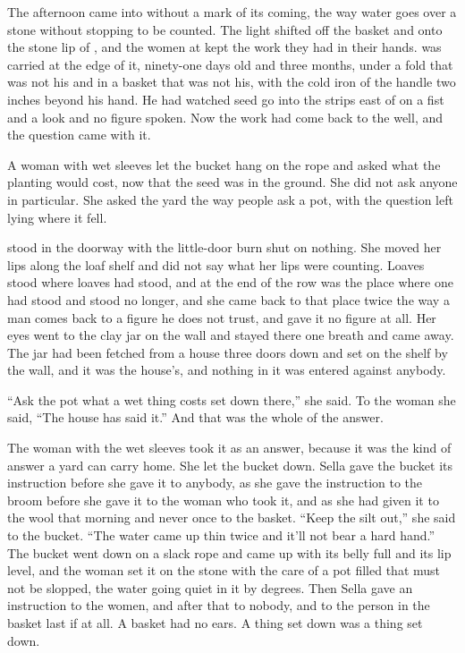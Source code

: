 The afternoon came into  without a mark of its coming, the way water goes over a stone without stopping to be counted. The light shifted off the basket and onto the stone lip of , and the women at  kept the work they had in their hands.  was carried at the edge of it, ninety-one days old and three months, under a fold that was not his and in a basket that was not his, with the cold iron of the handle two inches beyond his hand. He had watched seed go into the strips east of  on a fist and a look and no figure spoken. Now the work had come back to the well, and the question came with it.

A woman with wet sleeves let the bucket hang on the rope and asked what the planting would cost, now that the seed was in the ground. She did not ask anyone in particular. She asked the yard the way people ask a pot, with the question left lying where it fell.

 stood in the  doorway with the little-door burn shut on nothing. She moved her lips along the loaf shelf and did not say what her lips were counting. Loaves stood where loaves had stood, and at the end of the row was the place where one had stood and stood no longer, and she came back to that place twice the way a man comes back to a figure he does not trust, and gave it no figure at all. Her eyes went to the clay jar on the wall and stayed there one breath and came away. The jar had been fetched from a house three doors down and set on the shelf by the wall, and it was the house's, and nothing in it was entered against anybody.

“Ask the pot what a wet thing costs set down there,” she said. To the woman she said, “The house has said it.” And that was the whole of the answer.

The woman with the wet sleeves took it as an answer, because it was the kind of answer a yard can carry home. She let the bucket down. Sella gave the bucket its instruction before she gave it to anybody, as she gave the instruction to the broom before she gave it to the woman who took it, and as she had given it to the wool that morning and never once to the basket. “Keep the silt out,” she said to the bucket. “The water came up thin twice and it'll not bear a hard hand.” The bucket went down on a slack rope and came up with its belly full and its lip level, and the woman set it on the stone with the care of a pot filled that must not be slopped, the water going quiet in it by degrees. Then Sella gave an instruction to the women, and after that to nobody, and to the person in the basket last if at all. A basket had no ears. A thing set down was a thing set down.

